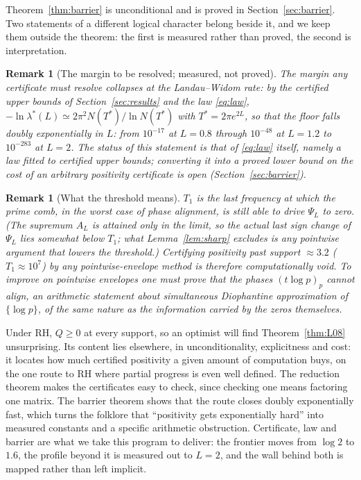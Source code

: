 ﻿\documentclass[11pt]{article}
\newtheorem{remark}[theorem]{Remark}
\newcommand{\lmin}{\lambda^{*}}
\newcommand{\Tstar}{T^{*}}
\begin{document}
Theorem~\ref{thm:barrier} is unconditional and is proved in
Section~\ref{sec:barrier}.  Two statements of a different logical
character belong beside it, and we keep them outside the theorem: the
first is measured rather than proved, the second is interpretation.

\begin{remark}[The margin to be resolved; measured, not proved]
\label{rem:barrier-rate}
The margin any certificate must resolve collapses at the
Landau--Widom rate: by the certified upper bounds of
Section~\ref{sec:results} and the law \eqref{eq:law},
$-\ln\lmin(L)\simeq2\pi^2 N(\Tstar)/\ln N(\Tstar)$ with
$\Tstar=2\pi e^{2L}$, so that the floor falls doubly exponentially in
$L$: from $10^{-17}$ at $L=0.8$ through $10^{-48}$ at $L=1.2$ to
$10^{-283}$ at $L=2$.  The status of this statement is that of
\eqref{eq:law} itself, namely a law fitted to certified upper bounds;
converting it into a proved lower bound on the cost of an arbitrary
positivity certificate is open (Section~\ref{sec:barrier}).
\end{remark}

\begin{remark}[What the threshold means]\label{rem:barrier-interp}
$T_1$ is the last frequency at which the prime comb, in the worst case
of phase alignment, is still able to drive $\Psi_L$ to zero.  (The
supremum $A_L$ is attained only in the limit, so the actual last sign
change of $\Psi_L$ lies somewhat below $T_1$; what
Lemma~\ref{lem:sharp} excludes is any pointwise argument that lowers
the threshold.)  Certifying positivity past support $\approx3.2$
($T_1\approx10^7$) by any pointwise-envelope method is therefore
computationally void.  To improve on pointwise envelopes one must prove
that the phases $(t\log p)_p$ cannot align, an arithmetic statement
about simultaneous Diophantine approximation of $\{\log p\}$, of the
same nature as the information carried by the zeros themselves.
\end{remark}

Under RH, $Q\ge0$ at every support, so an optimist will find
Theorem~\ref{thm:L08} unsurprising.  Its content lies elsewhere, in
unconditionality, explicitness and cost: it locates how much certified
positivity a given amount of computation buys, on the one route to RH
where partial progress is even well defined.  The reduction theorem
makes the certificates easy to check, since checking one means
factoring one matrix.  The barrier theorem shows that the route closes
doubly exponentially fast, which turns the folklore that ``positivity
gets exponentially hard'' into measured constants and a specific
arithmetic obstruction.  Certificate, law and barrier are what we take
this program to deliver: the frontier moves from $\log2$ to $1.6$, the
profile beyond it is measured out to $L=2$, and the wall behind both is
mapped rather than left implicit.
\end{document}
